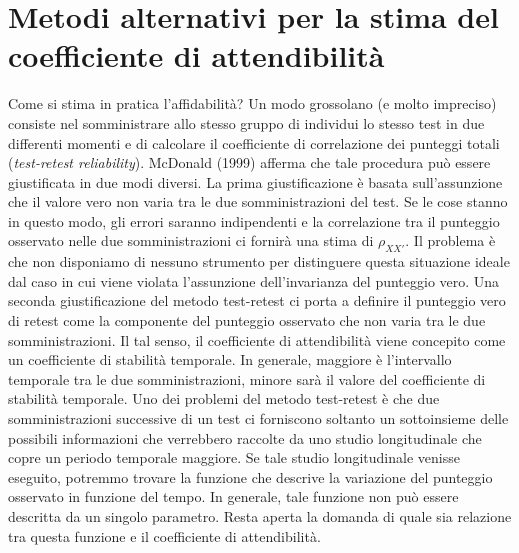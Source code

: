 %


\section{Metodi alternativi per la stima del coefficiente di attendibilità}

Come si stima in pratica l'affidabilità?  Un modo grossolano (e molto impreciso) consiste nel somministrare allo stesso gruppo di individui lo stesso test in due differenti momenti e di calcolare il coefficiente di correlazione dei punteggi totali (\emph{test-retest reliability}).   McDonald (1999) afferma che tale procedura può essere giustificata in due modi diversi.  La prima giustificazione è basata sull'assunzione che il valore vero non varia tra le due somministrazioni del test. Se le cose stanno in questo modo, gli errori saranno  indipendenti e la correlazione tra il punteggio osservato nelle due somministrazioni ci fornirà una stima di $\rho_{XX'}$. Il problema è che non disponiamo di nessuno strumento per distinguere questa situazione ideale dal caso in cui viene violata l'assunzione dell'invarianza del punteggio vero. Una seconda giustificazione del metodo test-retest ci porta a definire il punteggio vero di retest come la componente del punteggio osservato che non  varia tra le due somministrazioni.  Il tal senso, il coefficiente di attendibilità viene concepito come un coefficiente di stabilità temporale. In generale, maggiore è l'intervallo temporale tra le due  somministrazioni, minore sarà il valore del coefficiente di stabilità temporale. 
Uno dei problemi del metodo test-retest è che due somministrazioni successive di un test ci forniscono soltanto un sottoinsieme delle possibili informazioni che verrebbero raccolte da uno studio longitudinale che copre un periodo temporale maggiore. Se tale studio longitudinale venisse eseguito, potremmo trovare la funzione che descrive la variazione del punteggio osservato in funzione del tempo.
In generale, tale funzione non può essere descritta da un singolo  parametro.
Resta aperta la domanda di quale sia relazione tra questa funzione e il coefficiente  di attendibilità.

